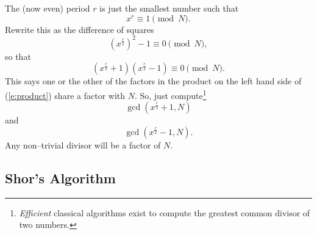 The (now even) period $r$ is just the smallest number such that
\begin{equation}
x^r\equiv 1\pmod{N}.
\end{equation}
Rewrite this as the difference of squares
\begin{equation}
\left(x^\frac{r}{2}\right)^2 - 1 \equiv 0\pmod{N},
\end{equation}
so that
\begin{equation}
\left(x^\frac{r}{2} + 1\right)
\left(x^\frac{r}{2} - 1\right)
\equiv 0\pmod{N}.
\label{e:product}
\end{equation}
This says one or the other of the factors in the product on the left 
hand side of (\ref{e:product}) share a factor with $N$.  So, just
compute\footnote{ 
\emph{Efficient} classical algorithms exist to compute the greatest
common divisor of two numbers\cite{Hardy/Wright:79}.
}
\begin{equation}
\gcd
\left(x^\frac{r}{2} + 1, N \right)
\end{equation}
and
\begin{equation}
\gcd
\left(x^\frac{r}{2} - 1, N \right).
\end{equation}
Any non--trivial divisor will be a factor of $N$.

\subsection{Shor's Algorithm}

